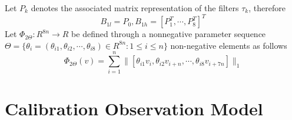 \documentclass[UTF8]{article}
\renewcommand{\le}{\leqslant}
\renewcommand{\le}{\leqslant}
\begin{document}
Let $P_k$ denotes the associated matrix representation of the filters $\tau_k$, therefore
\begin{equation*}
	B_{1l} = P_0 , B_{1h} = [P_1^T,\cdots, P_8^T]^T
\end{equation*}
Let $\Phi_{2 \Theta} : R^{8n} \rightarrow R$ be defined through a nonnegative parameter sequence $\Theta = \{\theta_i = (\theta_{i1}, \theta_{i2}, \cdots , \theta_{i8}) \in R^{8n} : 1\le i \le n\}$  non-negative elements as follows
\begin{equation*}
	\Phi_{2 \Theta}(v) = \sum_{i=1}^{n} \|[\theta_{i1}v_i, \theta_{i2} v_{i+n}, \cdots, \theta_{i8} v_{i+7n} ]\|_1
\end{equation*}


\section{Calibration Observation Model}
\end{document}

